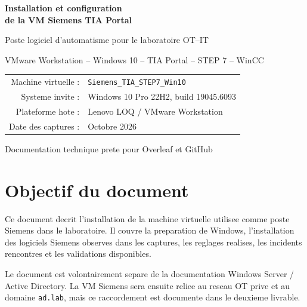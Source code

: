 \documentclass[11pt,a4paper]{article}
\begin{document}
\begin{titlepage}
    \centering
    \vspace*{3cm}

    {\Huge\bfseries
    Installation et configuration\\[0.3cm]
    de la VM Siemens TIA Portal
    \par}

    \vspace{1cm}

    {\Large
    Poste logiciel d'automatisme pour le laboratoire OT--IT
    \par}

    \vspace{1.5cm}

    {\large
    VMware Workstation -- Windows 10 -- TIA Portal -- STEP 7 -- WinCC
    \par}

    \vfill

    \begin{tabular}{rl}
        Machine virtuelle : & \texttt{Siemens\_TIA\_STEP7\_Win10} \\
        Systeme invite : & Windows 10 Pro 22H2, build 19045.6093 \\
        Plateforme hote : & Lenovo LOQ / VMware Workstation \\
        Date des captures : & Octobre 2026 \\
    \end{tabular}

    \vspace{2cm}

    {\large Documentation technique prete pour Overleaf et GitHub}

\end{titlepage}

\tableofcontents
\newpage

\section{Objectif du document}

Ce document decrit l'installation de la machine virtuelle utilisee
comme poste Siemens dans le laboratoire. Il couvre la preparation de
Windows, l'installation des logiciels Siemens observes dans les captures,
les reglages realises, les incidents rencontres et les validations
disponibles.

Le document est volontairement separe de la documentation
Windows Server / Active Directory. La VM Siemens sera ensuite reliee au
reseau OT prive et au domaine \texttt{ad.lab}, mais ce raccordement est
documente dans le deuxieme livrable.
\end{document}

